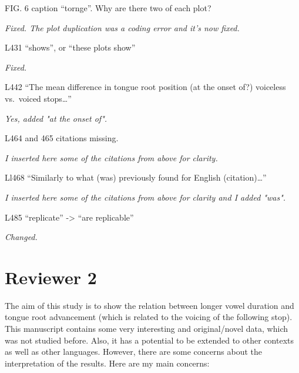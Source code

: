 \documentclass[]{article}
\begin{document}
FIG. 6 caption ``tornge''. Why are there two of each plot?

\begin{adjustwidth}{1cm}{} \textit{
Fixed. The plot duplication was a coding error and it's now fixed.
} \end{adjustwidth}

L431 ``shows'', or ``these plots show''

\begin{adjustwidth}{1cm}{} \textit{
Fixed.
} \end{adjustwidth}

L442 ``The mean difference in tongue root position (at the onset of?)
voiceless vs.~voiced stops\ldots{}''

\begin{adjustwidth}{1cm}{} \textit{
Yes, added "at the onset of".
} \end{adjustwidth}

L464 and 465 citations missing.

\begin{adjustwidth}{1cm}{} \textit{
I inserted here some of the citations from above for clarity.
} \end{adjustwidth}

Ll468 ``Similarly to what (was) previously found for English
(citation)\ldots{}''

\begin{adjustwidth}{1cm}{} \textit{
I inserted here some of the citations from above for clarity and I added "was".
} \end{adjustwidth}

L485 ``replicate'' -\textgreater{} ``are replicable''

\begin{adjustwidth}{1cm}{} \textit{
Changed.
} \end{adjustwidth}

\hypertarget{reviewer-2}{%
\section{Reviewer 2}\label{reviewer-2}}

The aim of this study is to show the relation between longer vowel
duration and tongue root advancement (which is related to the voicing of
the following stop). This manuscript contains some very interesting and
original/novel data, which was not studied before. Also, it has a
potential to be extended to other contexts as well as other languages.
However, there are some concerns about the interpretation of the
results. Here are my main concerns:
\end{document}
